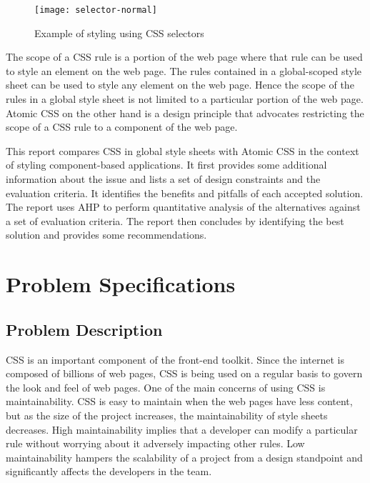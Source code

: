 \documentclass[12pt]{article}
\begin{document}
\vspace{0.5cm}

\begin{figure}[h]
\texttt{[image: selector-normal]}
\centering
\caption{Example of styling using CSS selectors}
\end{figure}

\vspace{0.5cm}

The scope of a CSS rule is a portion of the web page where that rule can be used to style an element on the web page. The rules contained in a global-scoped style sheet can be used to style any element on the web page. Hence the scope of the rules in a global style sheet is not limited to a particular portion of the web page. Atomic CSS on the other hand is a design principle that advocates restricting the scope of a CSS rule to a component of the web page.

This report compares CSS in global style sheets with Atomic CSS in the context of styling component-based applications. It first provides some additional information about the issue and lists a set of design constraints and the evaluation criteria. It identifies the benefits and pitfalls of each accepted solution. The report uses AHP to perform quantitative analysis of the alternatives against a set of evaluation criteria. The report then concludes by identifying the best solution and provides some recommendations.

\newpage

\section{Problem Specifications}
\subsection{Problem Description}
CSS is an important component of the front-end toolkit. Since the internet is composed of billions of web pages, CSS is being used on a regular basis to govern the look and feel of web pages. One of the main concerns of using CSS is maintainability. CSS is easy to maintain when the web pages have less content, but as the size of the project increases, the maintainability of style sheets decreases. High maintainability implies that a developer can modify a particular rule without worrying about it adversely impacting other rules. Low maintainability hampers the scalability of a project from a design standpoint and significantly affects the developers in the team.
\end{document}
